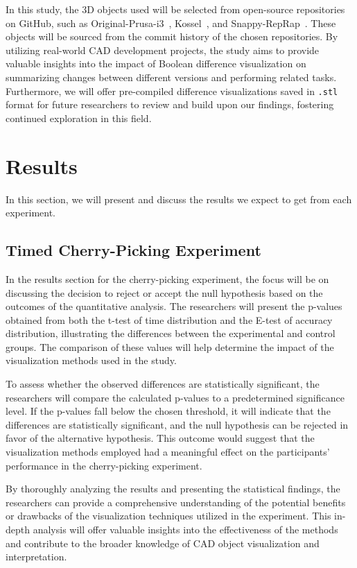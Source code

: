 \documentclass[sigconf,authorversion,nonacm]{acmart}
\begin{document}
In this study, the 3D objects used will be selected from open-source repositories on GitHub, such as Original-Prusa-i3~\cite{prusa3d_2022}, Kossel~\cite{ jcrocholl_2015}, and Snappy-RepRap~\cite{revarbat_2019}. 
These objects will be sourced from the commit history of the chosen repositories. By utilizing real-world CAD development projects, the study aims to provide valuable insights into the impact of Boolean difference visualization on summarizing changes between different versions and performing related tasks. 
Furthermore, we will offer pre-compiled difference visualizations saved in \texttt{.stl} format for future researchers to review and build upon our findings, fostering continued exploration in this field.

\section{Results}

In this section, we will present and discuss the results we expect to get from each experiment.

\subsection{Timed Cherry-Picking Experiment}

In the results section for the cherry-picking experiment, the focus will be on discussing the decision to reject or accept the null hypothesis based on the outcomes of the quantitative analysis.
The researchers will present the p-values obtained from both the t-test of time distribution and the E-test of accuracy distribution, illustrating the differences between the experimental and control groups.
The comparison of these values will help determine the impact of the visualization methods used in the study.

To assess whether the observed differences are statistically significant, the researchers will compare the calculated p-values to a predetermined significance level.
If the p-values fall below the chosen threshold, it will indicate that the differences are statistically significant, and the null hypothesis can be rejected in favor of the alternative hypothesis.
This outcome would suggest that the visualization methods employed had a meaningful effect on the participants' performance in the cherry-picking experiment.

By thoroughly analyzing the results and presenting the statistical findings, the researchers can provide a comprehensive understanding of the potential benefits or drawbacks of the visualization techniques utilized in the experiment.
This in-depth analysis will offer valuable insights into the effectiveness of the methods and contribute to the broader knowledge of CAD object visualization and interpretation.
\end{document}

